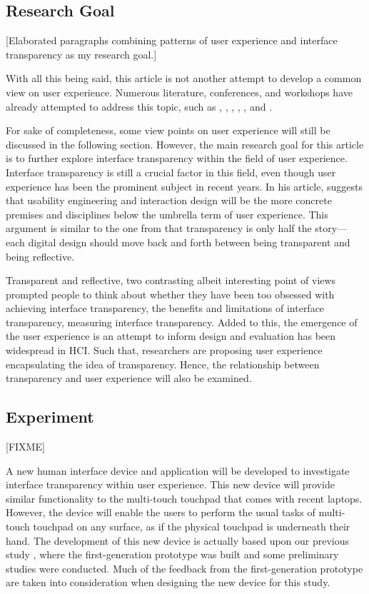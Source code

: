 \documentclass{acm_proc_article-sp}
\begin{document}
\subsection{Research Goal}
[Elaborated paragraphs combining patterns of user experience and
  interface transparency as my research goal.]

With all this being said, this article is not another attempt to
develop a common view on user experience. Numerous literature,
conferences, and workshops have already attempted to address this
topic, such as \citet{early:forlizzi}, \citet{emotional:norman},
\citet{action:dourish}, \citet{ux:hassenzahl},
\citet{experience:desmet}, and \citet{ux:law}.

For sake of completeness, some view points on user experience will
still be discussed in the following section. However, the main
research goal for this article is to further explore interface
transparency within the field of user experience. Interface
transparency is still a crucial factor in this field, even though user
experience has been the prominent subject in recent years. In his
article, \citet{future:memmel} suggests that usability engineering and
interaction design will be the more concrete premises and disciplines
below the umbrella term of user experience. This argument is similar
to the one from \citet{windows:bolter} that transparency is only half
the story---each digital design should move back and forth between
being transparent and being reflective.

Transparent and reflective, two contrasting albeit interesting point
of views prompted people to think about whether they have been too
obsessed with achieving interface transparency, the benefits and
limitations of interface transparency, measuring interface
transparency. Added to this, the emergence of the user experience is
an attempt to inform design and evaluation has been widespread in
HCI. Such that, researchers are proposing user experience
encapsulating the idea of transparency. Hence, the relationship
between transparency and user experience will also be examined.

\subsection{Experiment}
[FIXME]

A new human interface device and application will be developed to
investigate interface transparency within user experience. This new
device will provide similar functionality to the multi-touch touchpad
that comes with recent laptops. However, the device will enable the
users to perform the usual tasks of multi-touch touchpad on any
surface, as if the physical touchpad is underneath their hand. The
development of this new device is actually based upon our previous
study \citep{lmnt:huang}, where the first-generation prototype was
built and some preliminary studies were conducted. Much of the
feedback from the first-generation prototype are taken into
consideration when designing the new device for this study.
\end{document}
